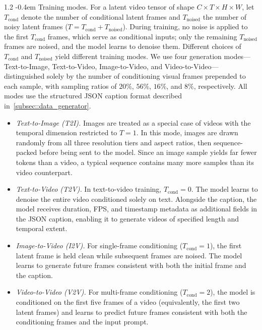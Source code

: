 \documentclass{llmxive}
\makeatletter
\providecommand{\paragraph}{  \@startsection{paragraph}{4}{\z@}    {1\baselineskip \@plus .2\baselineskip}    {-0.4em}    {\normalfont\normalsize\bfseries}}
\makeatother
\begin{document}
\paragraph{Training modes.}
For a latent video tensor of shape $C\times T\times H \times W$, let $T_{\textrm{cond}}$ denote the number of conditional latent frames and $T_{\textrm{noised}}$ the number of noisy latent frames ($T = T_{\textrm{cond}} + T_{\textrm{noised}}$). During training, no noise is applied to the first $T_{\textrm{cond}}$ frames, which serve as conditional inputs; only the remaining $T_{\textrm{noised}}$ frames are noised, and the model learns to denoise them. Different choices of $T_{\textrm{cond}}$ and $T_{\textrm{noised}}$ yield different training modes. We use four generation modes---Text-to-Image, Text-to-Video, Image-to-Video, and Video-to-Video---distinguished solely by the number of conditioning visual frames prepended to each sample, with sampling ratios of $20\%$, $56\%$, $16\%$, and $8\%$, respectively. All modes use the structured JSON caption format described in~\cref{subsec::data_generator}.


\begin{itemize}
\item \textit{Text-to-Image (T2I).} Images are treated as a special case of videos with the temporal dimension restricted to $T=1$. In this mode, images are drawn randomly from all three resolution tiers and aspect ratios, then sequence-packed before being sent to the model. Since an image sample yields far fewer tokens than a video, a typical sequence contains many more samples than its video counterpart.
\item \textit{Text-to-Video (T2V).} In text-to-video training, $T_{\textrm{cond}}=0$. The model learns to denoise the entire video conditioned solely on text. Alongside the caption, the model receives duration, FPS, and timestamp metadata as additional fields in the JSON caption, enabling it to generate videos of specified length and temporal extent.
\item \textit{Image-to-Video (I2V).} For single-frame conditioning ($T_{\textrm{cond}}=1$), the first latent frame is held clean while subsequent frames are noised. The model learns to generate future frames consistent with both the initial frame and the caption.
\item \textit{Video-to-Video (V2V).} For multi-frame conditioning ($T_{\textrm{cond}}=2$), the model is conditioned on the first five frames of a video (equivalently, the first two latent frames) and learns to predict future frames consistent with both the conditioning frames and the input prompt.
\end{itemize}
\end{document}
